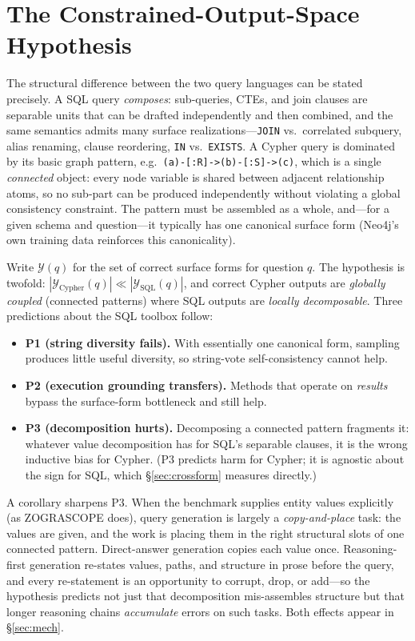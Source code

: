 \documentclass[11pt]{article}
\begin{document}
\section{The Constrained-Output-Space Hypothesis}
\label{sec:hyp}
The structural difference between the two query languages can be stated precisely. A SQL query
\emph{composes}: sub-queries, CTEs, and join clauses are separable units that can be drafted
independently and then combined, and the same semantics admits many surface realizations---\texttt{JOIN}
vs.\ correlated subquery, alias renaming, clause reordering, \texttt{IN} vs.\ \texttt{EXISTS}. A Cypher
query is dominated by its basic graph pattern, e.g.\ \texttt{(a)-[:R]->(b)-[:S]->(c)}, which is a
single \emph{connected} object: every node variable is shared between adjacent relationship atoms, so
no sub-part can be produced independently without violating a global consistency constraint. The
pattern must be assembled as a whole, and---for a given schema and question---it typically has one
canonical surface form (Neo4j's own training data reinforces this canonicality).

Write $\mathcal{Y}(q)$ for the set of correct surface forms for question $q$. The hypothesis is
twofold: $|\mathcal{Y}_{\text{Cypher}}(q)| \ll |\mathcal{Y}_{\text{SQL}}(q)|$, and correct Cypher
outputs are \emph{globally coupled} (connected patterns) where SQL outputs are \emph{locally
decomposable}. Three predictions about the SQL toolbox follow:
\begin{itemize}[leftmargin=*]
  \item \textbf{P1 (string diversity fails).} With essentially one canonical form, sampling produces
  little useful diversity, so string-vote self-consistency cannot help.
  \item \textbf{P2 (execution grounding transfers).} Methods that operate on \emph{results} bypass
  the surface-form bottleneck and still help.
  \item \textbf{P3 (decomposition hurts).} Decomposing a connected pattern fragments it: whatever
  value decomposition has for SQL's separable clauses, it is the wrong inductive bias for Cypher.
  (P3 predicts harm for Cypher; it is agnostic about the sign for SQL, which \S\ref{sec:crossform}
  measures directly.)
\end{itemize}

A corollary sharpens P3. When the benchmark supplies entity values explicitly (as ZOGRASCOPE does),
query generation is largely a \emph{copy-and-place} task: the values are given, and the work is
placing them in the right structural slots of one connected pattern. Direct-answer generation copies
each value once. Reasoning-first generation re-states values, paths, and structure in prose before
the query, and every re-statement is an opportunity to corrupt, drop, or add---so the hypothesis
predicts not just that decomposition mis-assembles structure but that longer reasoning chains
\emph{accumulate} errors on such tasks. Both effects appear in \S\ref{sec:mech}.
\end{document}

